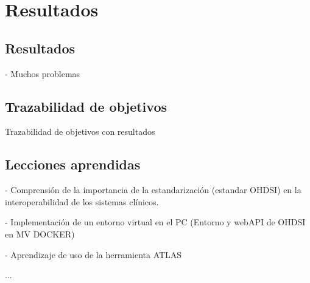 \chapter{Resultados}\label{cap:10resultados}

\section{Resultados}

- Muchos problemas

\section{Trazabilidad de objetivos}

Trazabilidad de objetivos con resultados

\section{Lecciones aprendidas}

- Comprensión de la importancia de la estandarización (estandar OHDSI) en la interoperabilidad de los sistemas clínicos.

- Implementación de un entorno virtual en el PC (Entorno y webAPI de OHDSI en MV DOCKER)

- Aprendizaje de uso de la herramienta ATLAS

...